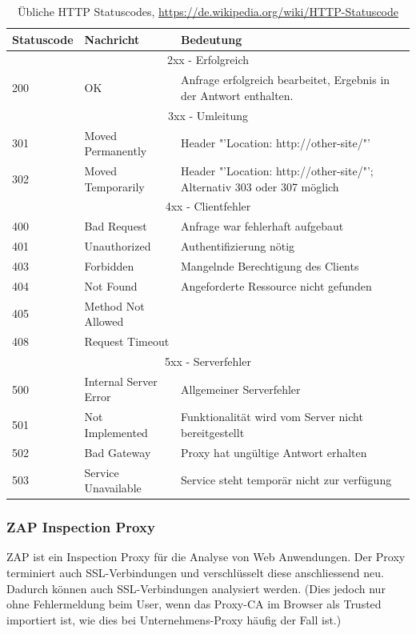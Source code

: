 \begin{table}[H]
	\begin{tabularx}{\textwidth}{l|p{100pt}|X}
		\textbf{Statuscode} & \textbf{Nachricht} & \textbf{Bedeutung}\\ \hline
		\multicolumn{3}{c}{2xx - Erfolgreich} \\ \hline
		200 & OK & Anfrage erfolgreich bearbeitet, Ergebnis in der Antwort enthalten. \\ \hline
		\multicolumn{3}{c}{3xx - Umleitung} \\ \hline
		301 & Moved Permanently & Header "'Location: http://other-site/"' \\ \hline
		302 & Moved Temporarily & Header "'Location: http://other-site/"'; Alternativ 303 oder 307 möglich \\ \hline
		\multicolumn{3}{c}{4xx - Clientfehler} \\ \hline
		400 & Bad Request & Anfrage war fehlerhaft aufgebaut \\ \hline
		401 & Unauthorized & Authentifizierung nötig \\ \hline
		403 & Forbidden & Mangelnde Berechtigung des Clients \\ \hline
		404 & Not Found & Angeforderte Ressource nicht gefunden \\ \hline
		405 & Method Not Allowed & \\ \hline
		408 & Request Timeout & \\ \hline
		\multicolumn{3}{c}{5xx - Serverfehler} \\ \hline
		500 & Internal Server Error & Allgemeiner Serverfehler \\ \hline
		501 & Not Implemented & Funktionalität wird vom Server nicht bereitgestellt \\ \hline
		502 & Bad Gateway & Proxy hat ungültige Antwort erhalten \\ \hline
		503 & Service Unavailable & Service steht temporär nicht zur verfügung \\ \hline
	\end{tabularx}
	\caption{Übliche HTTP Statuscodes, \url{https://de.wikipedia.org/wiki/HTTP-Statuscode}}
\end{table}

\subsubsection{ZAP Inspection Proxy}
ZAP ist ein Inspection Proxy für die Analyse von Web Anwendungen. Der Proxy terminiert auch SSL-Verbindungen und verschlüsselt diese anschliessend neu. Dadurch können auch SSL-Verbindungen analysiert werden. (Dies jedoch nur ohne Fehlermeldung beim User, wenn das Proxy-CA im Browser als Trusted importiert ist, wie dies bei Unternehmens-Proxy häufig der Fall ist.)

